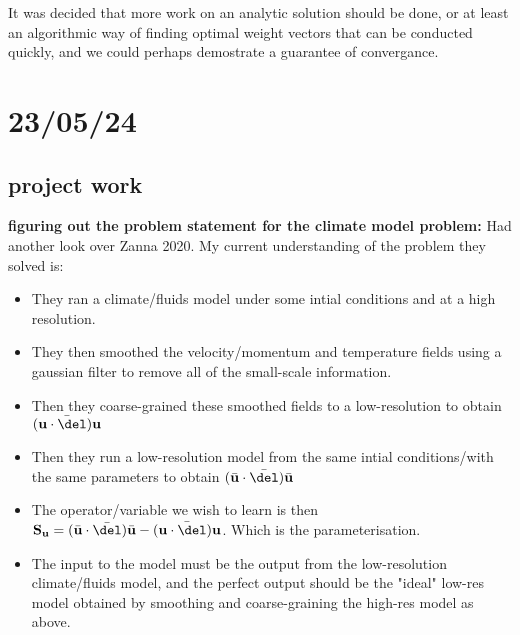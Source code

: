 \documentclass[11pt,a4paper]{article}
\begin{document}
It was decided that more work on an analytic solution should be done, or at least an algorithmic way of finding optimal weight vectors that can be conducted quickly, and we could perhaps demostrate a guarantee of convergance.

\section{23/05/24}

\subsection{project work}

\textbf{figuring out the problem statement for the climate model problem:}
Had another look over Zanna 2020.
My current understanding of the problem they solved is:
\begin{itemize}
  \item They ran a climate/fluids model under some intial conditions and at a high resolution.
  \item They then smoothed the velocity/momentum and temperature fields using a gaussian filter to remove all of the small-scale information.
  \item Then they coarse-grained these smoothed fields to a low-resolution to obtain $\bar{(\mathbf{u}\cdot \del)\mathbf{u}}$
  \item Then they run a low-resolution model from the same intial conditions/with the same parameters to obtain $(\bar{\mathbf{u}}\cdot \bar{\del})\bar{\mathbf{u}}$
  \item The operator/variable we wish to learn is then $\mathbf{S_u} = (\bar{\mathbf{u}}\cdot \bar{\del})\bar{\mathbf{u}} - \bar{(\mathbf{u}\cdot \del)\mathbf{u}}$. Which is the parameterisation.
  \item The input to the model must be the output from the low-resolution climate/fluids model, and the perfect output should be the "ideal" low-res model obtained by smoothing and coarse-graining the high-res model as above.
\end{itemize}
\end{document}
